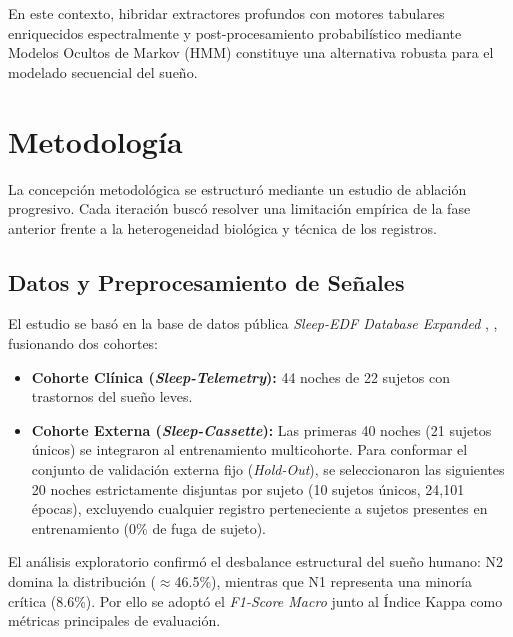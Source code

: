 \documentclass[conference]{IEEEtran}
\begin{document}
En este contexto, hibridar extractores profundos con motores tabulares enriquecidos espectralmente y post-procesamiento probabilístico mediante Modelos Ocultos de Markov (HMM) constituye una alternativa robusta para el modelado secuencial del sueño.

\section{Metodología}
La concepción metodológica se estructuró mediante un estudio de ablación progresivo. Cada iteración buscó resolver una limitación empírica de la fase anterior frente a la heterogeneidad biológica y técnica de los registros.

\subsection{Datos y Preprocesamiento de Señales}
El estudio se basó en la base de datos pública \textit{Sleep-EDF Database Expanded} \cite{sleepedfx_dataset}, \cite{goldberger2000}, fusionando dos cohortes:
\begin{itemize}
    \item \textbf{Cohorte Clínica (\textit{Sleep-Telemetry}):} 44 noches de 22 sujetos con trastornos del sueño leves.
    \item \textbf{Cohorte Externa (\textit{Sleep-Cassette}):} Las primeras 40 noches (21 sujetos únicos) se integraron al entrenamiento multicohorte. Para conformar el conjunto de validación externa fijo (\textit{Hold-Out}), se seleccionaron las siguientes 20 noches estrictamente disjuntas por sujeto (10 sujetos únicos, 24,101 épocas), excluyendo cualquier registro perteneciente a sujetos presentes en entrenamiento (0\% de fuga de sujeto).
\end{itemize}

El análisis exploratorio confirmó el desbalance estructural del sueño humano: N2 domina la distribución ($\approx$46.5\%), mientras que N1 representa una minoría crítica (8.6\%). Por ello se adoptó el \textit{F1-Score Macro} junto al Índice Kappa como métricas principales de evaluación.
\end{document}
